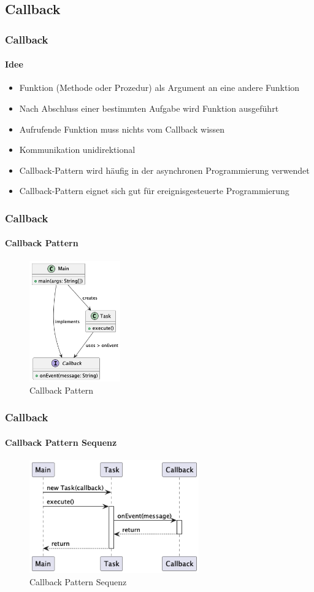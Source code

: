 \subsection{Callback}
\begin{frame}
  \frametitle{Callback}
  \framesubtitle{Idee}
  \begin{itemize}
    \item Funktion (Methode oder Prozedur) als Argument an eine andere Funktion
    \item Nach Abschluss einer bestimmten Aufgabe wird Funktion ausgeführt
    \item Aufrufende Funktion muss nichts vom Callback wissen
    \item Kommunikation unidirektional
    \item Callback-Pattern wird häufig in der asynchronen Programmierung verwendet
    \item Callback-Pattern eignet sich gut für ereignisgesteuerte Programmierung
  \end{itemize}
\end{frame}

\begin{frame}
  \frametitle{Callback}
  \framesubtitle{Callback Pattern}
  \begin{figure}[!ht]
    \centering
    \includegraphics[width=0.35\textwidth]{fig/uml/callback-class.png}
    \caption{Callback Pattern}
    \label{fig:callback-class}
  \end{figure}
\end{frame}

\begin{frame}
  \frametitle{Callback}
  \framesubtitle{Callback Pattern Sequenz}
  \begin{figure}[!ht]
    \centering
    \includegraphics[width=0.65\textwidth]{fig/uml/callback-seq.png}
    \caption{Callback Pattern Sequenz}
    \label{fig:callback-seq}
  \end{figure}
\end{frame}
